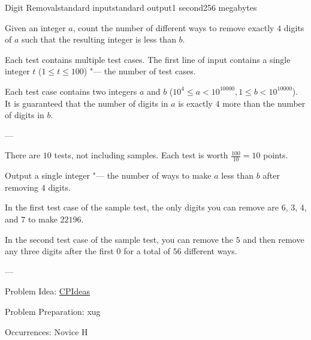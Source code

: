 \begin{problem}{Digit Removal}{standard input}{standard output}{1 second}{256 megabytes}

Given an integer $a$, count the number of different ways to remove exactly $4$ digits of $a$ such that the resulting integer is less than $b$.

\InputFile
Each test contains multiple test cases. The first line of input contains a single integer $t$ ($1 \le t \le 100$) "--- the number of test cases.

Each test case contains two integers $a$ and $b$ ($10^4 \le a < 10^{10000}, 1 \le b < 10^{10000}$). It is guaranteed that the number of digits in $a$ is exactly $4$ more than the number of digits in $b$.

---

There are $10$ tests, not including samples. Each test is worth $\frac{100}{10}=10$ points.

\OutputFile
Output a single integer "--- the number of ways to make $a$ less than $b$ after removing $4$ digits.

\Example

\begin{example}
%
\end{example}

\Note
In the first test case of the sample test, the only digits you can remove are $6$, $3$, $4$, and $7$ to make $22196$.

In the second test case of the sample test, you can remove the $5$ and then remove any three digits after the first $0$ for a total of $56$ different ways.

---

Problem Idea: \href{https://fjzzq2002.github.io/cpideas/}{CPIdeas}

Problem Preparation: xug

Occurrences: Novice H

\end{problem}


